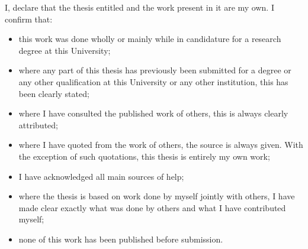 \begin{authordeclaration}

    I, \theauthor declare that the thesis entitled \thetitle and
    the work present in it are my own. I confirm that:

    \begin{itemize}
    \item this work was done wholly or mainly while in
    candidature for a research degree at this University;
    \item where any part of this thesis has previously been
        submitted for a degree or any other qualification at this
        University or any other institution, this has been clearly
        stated;
        \item where I have consulted the published work of others,
        this is always clearly attributed;
        \item where I have quoted from the work of others, the
        source is always given. With the exception of such
        quotations, this thesis is entirely my own work;
        \item I have acknowledged all main sources of help;
        \item where the thesis is based on work done by myself
        jointly with others, I have made clear exactly what was
        done by others and what I have contributed myself;
        \item none of this work has been published before
        submission.
    \end{itemize}

\end{authordeclaration}
